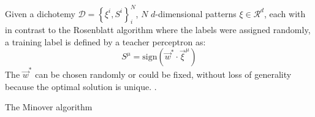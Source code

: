 Given a dichotemy $\mathcal{D} = \left\{\xi^i, S^i \right\}_{i}^{N}$, $N$ $d$-dimensional patterns $\xi \in \mathcal{R}^d$, each with in contrast to the Rosenblatt algorithm where the labels were assigned randomly, a training label is defined by a teacher perceptron as:
\begin{equation}
	S^\mu = \text{sign}(\vec{w}^* \cdot {\vec{\xi}}^{\mu})
\end{equation}
The $\vec{w}^*$ can be chosen randomly or could be fixed, without loss of generality because the optimal solution is unique. .

The Minover algorithm  